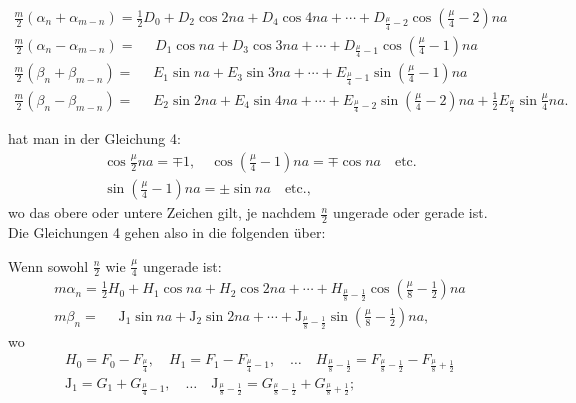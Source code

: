 \begin{landscape}
\[\begin{array}{l}
\frac{m}{2}(\alpha_n+\alpha_{m-n}) = \tfrac{1}{2}D_0 + D_2\cos 2na + D_4\cos 4na + \cdots + D_{\frac{\mu}{4}-2}\cos\left(\frac{\mu}{4}-2\right)na \\[4pt]
\frac{m}{2}(\alpha_n-\alpha_{m-n}) = \phantom{{}={}} D_1\cos na + D_3\cos 3na + \cdots + D_{\frac{\mu}{4}-1}\cos\left(\frac{\mu}{4}-1\right)na \\[4pt]
\frac{m}{2}(\beta_n+\beta_{m-n}) = \phantom{{}={}} E_1\sin na + E_3\sin 3na + \cdots + E_{\frac{\mu}{4}-1}\sin\left(\frac{\mu}{4}-1\right)na \\[4pt]
\frac{m}{2}(\beta_n-\beta_{m-n}) = \phantom{{}={}} E_2\sin 2na + E_4\sin 4na + \cdots + E_{\frac{\mu}{4}-2}\sin\left(\frac{\mu}{4}-2\right)na + \tfrac{1}{2}E_{\frac{\mu}{4}}\sin\frac{\mu}{4}na.
\end{array}
\]
\par\nobreak\medskip\noindent\hfill{}\hfill\mbox{}\par\nobreak\smallskip\noindent
hat man in \VtwoLowPoint der Gleichung 4:
\[
\begin{gathered}
\cos\frac{\mu}{2}na = \mp 1, \quad \cos\left(\frac{\mu}{4}-1\right)na = \mp\cos na \quad \text{etc.}\\[4pt]
\sin\left(\frac{\mu}{4}-1\right)na = \pm\sin na \quad \text{etc.,}
\end{gathered}
\]
wo das obere oder untere Zeichen gilt, je nachdem \(\frac{n}{2}\) ungerade oder gerade ist. Die Gleichungen 4 gehen also in die folgenden \"uber:
\par\noindent\hspace*{\parindent}Wenn sowohl \(\frac{n}{2}\) wie \(\frac{\mu}{4}\) ungerade ist:
\[
\tag*{7)}
\begin{array}{l}
m\alpha_n = \tfrac{1}{2}H_0 + H_1\cos na + H_2\cos 2na + \cdots + H_{\frac{\mu}{8}-\frac{1}{2}}\cos\left(\frac{\mu}{8}-\frac{1}{2}\right)na \\[4pt]
m\beta_n = \phantom{{}={}} \mathrm{J}_1\sin na + \mathrm{J}_2\sin 2na + \cdots + \mathrm{J}_{\frac{\mu}{8}-\frac{1}{2}}\sin\left(\frac{\mu}{8}-\frac{1}{2}\right)na,
\end{array}
\]
wo
\[
\begin{gathered}
H_0 = F_0 - F_{\frac{\mu}{4}}, \quad H_1 = F_1 - F_{\frac{\mu}{4}-1}, \quad \ldots \quad H_{\frac{\mu}{8}-\frac{1}{2}} = F_{\frac{\mu}{8}-\frac{1}{2}} - F_{\frac{\mu}{8}+\frac{1}{2}}\\[4pt]
\mathrm{J}_1 = G_1 + G_{\frac{\mu}{4}-1}, \quad \ldots \quad \mathrm{J}_{\frac{\mu}{8}-\frac{1}{2}} = G_{\frac{\mu}{8}-\frac{1}{2}} + G_{\frac{\mu}{8}+\frac{1}{2}};

\end{gathered}\]
\end{landscape}

